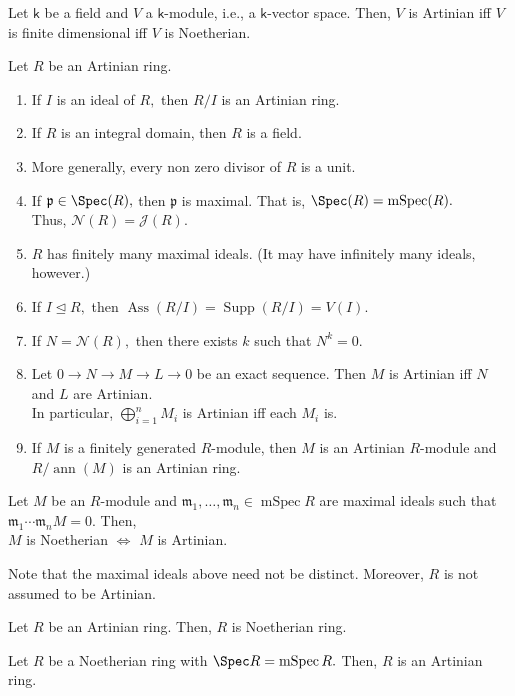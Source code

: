 \documentclass[12pt]{article}	%
\DeclareMathOperator{\Ass}{Ass}
\DeclareMathOperator{\mSpec}{mSpec}
\DeclareMathOperator{\Supp}{Supp}
\DeclareMathOperator{\ann}{ann}
\begin{document}
\begin{prop}
	Let $\mathsf{k}$ be a field and $V$ a $\mathsf{k}$-module, i.e., a $\mathsf{k}$-vector space. Then, $V$ is Artinian iff $V$ is finite dimensional iff $V$ is Noetherian.
\end{prop}

\begin{prop}
	Let $R$ be an Artinian ring.
	\begin{enumerate}
		\item If $I$ is an ideal of $R,$ then $R/I$ is an Artinian ring.
		\item If $R$ is an integral domain, then $R$ is a field.
		\item More generally, every non zero divisor of $R$ is a unit.
		\item If $\mathfrak{p} \in \Spec(R),$ then $\mathfrak{p}$ is maximal. That is, $\Spec(R) = \mSpec(R).$ \\
		Thus, $\mathcal{N}(R) = \mathcal{J}(R).$
		\item $R$ has finitely many maximal ideals. (It may have infinitely many ideals, however.)
		\item If $I \unlhd R,$ then $\Ass(R/I) = \Supp(R/I) = V(I).$
		\item If $N = \mathcal{N}(R),$ then there exists $k$ such that $N^k = 0.$
		\item Let $0 \to N \to M \to L \to 0$ be an exact sequence. Then $M$ is Artinian iff $N$ and $L$ are Artinian.\\
		In particular, $\bigoplus_{i = 1}^n M_i$ is Artinian iff each $M_i$ is.
		\item If $M$ is a finitely generated $R$-module, then $M$ is an Artinian $R$-module and $R/\ann(M)$ is an Artinian ring.
	\end{enumerate}
\end{prop}

\begin{prop}
	Let $M$ be an $R$-module and $\mathfrak{m}_1, \ldots, \mathfrak{m}_n \in \mSpec R$ are maximal ideals such that $\mathfrak{m}_1\cdots\mathfrak{m}_nM = 0.$ Then,\\
	$M$ is Noetherian $\iff$ $M$ is Artinian.
\end{prop}
Note that the maximal ideals above need not be distinct. Moreover, $R$ is not assumed to be Artinian.

\begin{prop}
	Let $R$ be an Artinian ring. Then, $R$ is Noetherian ring.
\end{prop}
\begin{prop}
	Let $R$ be a Noetherian ring with $\Spec R = \mSpec R.$ Then, $R$ is an Artinian ring.
\end{prop}
\end{document}
